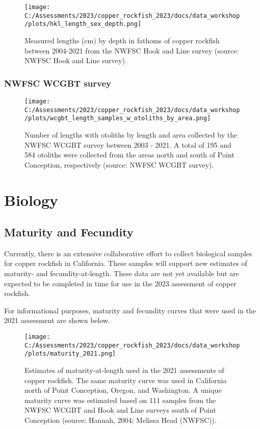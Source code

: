 \documentclass[
]{article}
\begin{document}
\begin{figure}
\centering
\texttt{[image: C:/Assessments/2023/copper\_rockfish\_2023/docs/data\_workshop/plots/hkl\_length\_sex\_depth.png]}
\caption{Measured lengths (cm) by depth in fathoms of copper rockfish
between 2004-2021 from the NWFSC Hook and Line survey (source: NWFSC
Hook and Line survey).\label{fig:hkl-length-depth}}
\end{figure}

\hypertarget{nwfsc-wcgbt-survey}{%
\subsubsection{NWFSC WCGBT survey}\label{nwfsc-wcgbt-survey}}

\begin{figure}
\centering
\texttt{[image: C:/Assessments/2023/copper\_rockfish\_2023/docs/data\_workshop/plots/wcgbt\_length\_samples\_w\_otoliths\_by\_area.png]}
\caption{Number of lengths with otoliths by length and area collected by
the NWFSC WCGBT survey between 2003 - 2021. A total of 195 and 584
otoliths were collected from the areas north and south of Point
Conception, respectively (source: NWFSC WCGBT
survey).\label{fig:wcgbt-lengths}}
\end{figure}

\hypertarget{biology}{%
\section{Biology}\label{biology}}

\hypertarget{maturity-and-fecundity}{%
\subsection{Maturity and Fecundity}\label{maturity-and-fecundity}}

Currently, there is an extensive collaborative effort to collect
biological samples for copper rockfish in California. These samples will
support new estimates of maturity- and fecundity-at-length. These data
are not yet available but are expected to be completed in time for use
in the 2023 assessment of copper rockfish.

For informational purposes, maturity and fecundity curves that were used
in the 2021 assessment are shown below.

\begin{figure}
\centering
\texttt{[image: C:/Assessments/2023/copper\_rockfish\_2023/docs/data\_workshop/plots/maturity\_2021.png]}
\caption{Estimates of maturity-at-length used in the 2021 assessments of
copper rockfish. The same maturity curve was used in California north of
Point Conception, Oregon, and Washington. A unique maturity curve was
estimated based on 111 samples from the NWFSC WCGBT and Hook and Line
surveys south of Point Conception (source: Hannah, 2004; Melissa Head
(NWFSC)).\label{fig:maturity-2021}}
\end{figure}
\end{document}
